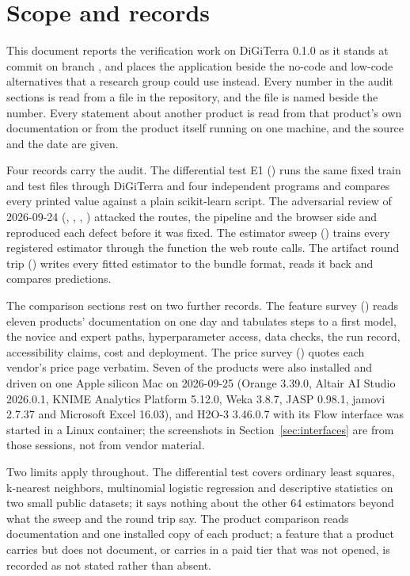 \section{Scope and records}

This document reports the verification work on DiGiTerra 0.1.0 as it stands at commit  on branch , and places the application beside the no-code and low-code alternatives that a research group could use instead. Every number in the audit sections is read from a file in the repository, and the file is named beside the number. Every statement about another product is read from that product's own documentation or from the product itself running on one machine, and the source and the date are given.

Four records carry the audit. The differential test E1 () runs the same fixed train and test files through DiGiTerra and four independent programs and compares every printed value against a plain scikit-learn script. The adversarial review of 2026-09-24 (, , , ) attacked the routes, the pipeline and the browser side and reproduced each defect before it was fixed. The estimator sweep () trains every registered estimator through the function the web route calls. The artifact round trip () writes every fitted estimator to the bundle format, reads it back and compares predictions.

The comparison sections rest on two further records. The feature survey () reads eleven products' documentation on one day and tabulates steps to a first model, the novice and expert paths, hyperparameter access, data checks, the run record, accessibility claims, cost and deployment. The price survey () quotes each vendor's price page verbatim. Seven of the products were also installed and driven on one Apple silicon Mac on 2026-09-25 (Orange 3.39.0, Altair AI Studio 2026.0.1, KNIME Analytics Platform 5.12.0, Weka 3.8.7, JASP 0.98.1, jamovi 2.7.37 and Microsoft Excel 16.03), and H2O-3 3.46.0.7 with its Flow interface was started in a Linux container; the screenshots in Section~\ref{sec:interfaces} are from those sessions, not from vendor material.

Two limits apply throughout. The differential test covers ordinary least squares, k-nearest neighbors, multinomial logistic regression and descriptive statistics on two small public datasets; it says nothing about the other 64 estimators beyond what the sweep and the round trip say. The product comparison reads documentation and one installed copy of each product; a feature that a product carries but does not document, or carries in a paid tier that was not opened, is recorded as not stated rather than absent.
